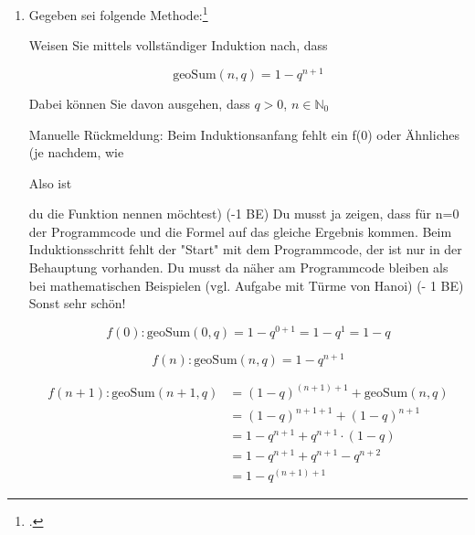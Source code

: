 \documentclass{lehramt-informatik-aufgabe}
\begin{document}
\begin{enumerate}
\item Gegeben sei folgende Methode:\footcite{sosy:e-klausur}


Weisen Sie mittels vollständiger Induktion nach, dass

\begin{displaymath}
\text{geoSum}(n,q) = 1 - q^{n+1}
\end{displaymath}

Dabei können Sie davon ausgehen, dass $q > 0$, $ n \in \mathbb{N}_0$

Manuelle Rückmeldung:
Beim Induktionsanfang fehlt ein f(0) oder Ähnliches (je nachdem, wie

Also ist

du die Funktion nennen möchtest) (-1 BE) Du musst ja zeigen, dass für
n=0 der Programmcode und die Formel auf das gleiche Ergebnis kommen.
Beim Induktionsschritt fehlt der "Start" mit dem Programmcode, der ist
nur in der Behauptung vorhanden. Du musst da näher am Programmcode
bleiben als bei mathematischen Beispielen (vgl. Aufgabe mit Türme von
Hanoi) (- 1 BE) Sonst sehr schön!

\begin{antwort}

\begin{displaymath}
f(0): \text{geoSum}(0, q) = 1 - q^{0+1} = 1 - q^1 = 1 - q
\end{displaymath}


\begin{displaymath}
f(n): \text{geoSum}(n, q) = 1 - q^{n+1}
\end{displaymath}


\begin{align*}
f(n+1): \text{geoSum}(n + 1, q)
& = (1 - q)^{(n + 1) + 1} + \text{geoSum}(n, q) \\
& = (1 - q)^{n + 1 + 1} + (1 - q)^{n + 1} \\
& = 1-q^{n+1} + q^{n+1} \cdot (1-q) \\
& = 1-q^{n+1}+q^{n+1}-q^{n+2} \\
& = 1-q^{(n+1)+1}
\end{align*}

\end{antwort}


\end{enumerate}
\end{document}

